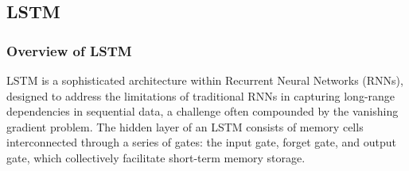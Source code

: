 \subsection{LSTM}
\subsubsection{Overview of LSTM}
LSTM is a sophisticated architecture within Recurrent Neural Networks (RNNs), designed to address the limitations of traditional RNNs in capturing long-range dependencies in sequential data, 
a challenge often compounded by the vanishing gradient problem. The hidden layer of an LSTM consists of memory cells interconnected through a series of gates: the input gate, forget gate, and output gate, which collectively facilitate short-term memory storage.

